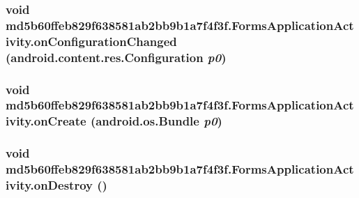 \hypertarget{classmd5b60ffeb829f638581ab2bb9b1a7f4f3f_1_1_forms_application_activity_108e7f1e4608413c4285ccd9293f10d3}{
\subsubsection[{onConfigurationChanged}]{\setlength{\rightskip}{0pt plus 5cm}void md5b60ffeb829f638581ab2bb9b1a7f4f3f.FormsApplicationActivity.onConfigurationChanged (android.content.res.Configuration {\em p0})}}
\label{classmd5b60ffeb829f638581ab2bb9b1a7f4f3f_1_1_forms_application_activity_108e7f1e4608413c4285ccd9293f10d3}


\hypertarget{classmd5b60ffeb829f638581ab2bb9b1a7f4f3f_1_1_forms_application_activity_664ba17cbf3ebd56c935e5951f737ce7}{
\subsubsection[{onCreate}]{\setlength{\rightskip}{0pt plus 5cm}void md5b60ffeb829f638581ab2bb9b1a7f4f3f.FormsApplicationActivity.onCreate (android.os.Bundle {\em p0})}}
\label{classmd5b60ffeb829f638581ab2bb9b1a7f4f3f_1_1_forms_application_activity_664ba17cbf3ebd56c935e5951f737ce7}


\hypertarget{classmd5b60ffeb829f638581ab2bb9b1a7f4f3f_1_1_forms_application_activity_02f63a90badc8b1d521dabd762926bd3}{
\subsubsection[{onDestroy}]{\setlength{\rightskip}{0pt plus 5cm}void md5b60ffeb829f638581ab2bb9b1a7f4f3f.FormsApplicationActivity.onDestroy ()}}
\label{classmd5b60ffeb829f638581ab2bb9b1a7f4f3f_1_1_forms_application_activity_02f63a90badc8b1d521dabd762926bd3}


